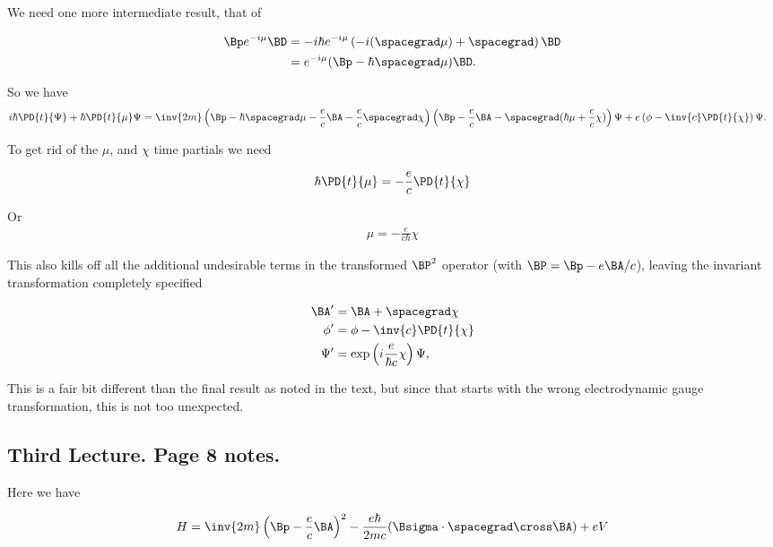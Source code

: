 We need one more intermediate result, that of

\begin{align*}
\Bp e^{-i \mu } \BD
&= 
- i \hbar e^{-i \mu} \left( -i (\spacegrad \mu) + \spacegrad \right) \BD \\
&= 
e^{-i\mu} (\Bp - \hbar \spacegrad \mu) \BD.
\end{align*}

So we have
\begin{align*}
i \hbar \PD{t}{\Psi}
+\hbar \PD{t}{\mu} \Psi 
&=
\inv{2m}
\left(\Bp - \hbar \spacegrad \mu -\frac{e}{c} \BA -\frac{e}{c} \spacegrad \chi \right)
\left( \Bp - \frac{e}{c} \BA - \spacegrad (\hbar \mu + \frac{e}{c} \chi) \right) \Psi 
+ e \left( \phi - \inv{c} \PD{t}{\chi} \right) \Psi.
\end{align*}

To get rid of the $\mu$, and $\chi$ time partials we need

\begin{align*}
\hbar \PD{t}{\mu} = - \frac{e}{c} \PD{t}{\chi}
\end{align*}

Or 
\begin{align*}
\mu = - \frac{e}{c\hbar} \chi
\end{align*}

This also kills off all the additional undesirable terms in the transformed $\BP^2$ operator (with $\BP = \Bp - e \BA/c$), leaving the invariant transformation completely specified

\begin{align*}
\BA' &= \BA + \spacegrad \chi \\
\phi' &= \phi - \inv{c} \PD{t}{ \chi } \\
\Psi' &= \exp\left( i \frac{e}{ \hbar c } \chi \right) \Psi,
\end{align*}

This is a fair bit different than the final result as noted in the text, but since that starts with the wrong electrodynamic gauge transformation, this is not too unexpected.

\subsection{Third Lecture.  Page 8 notes.}

Here we have

\begin{align*}
H = \inv{2m} \left( \Bp - \frac{e}{c}\BA \right)^2 - \frac{e \hbar}{2 m c} (\Bsigma \cdot \spacegrad \cross \BA) + e V
\end{align*}

